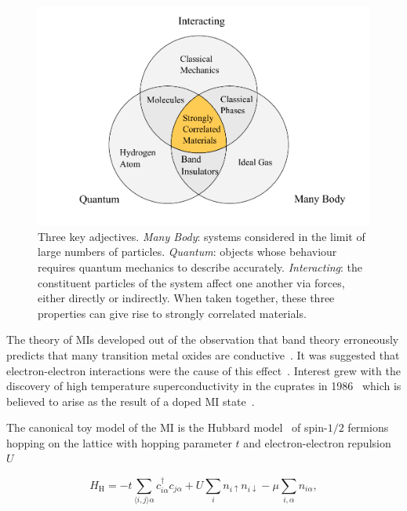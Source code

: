 \hypertarget{fig:venn_diagram}{%
\begin{figure}
\centering
\includegraphics[width=1\textwidth,height=\textheight]{figure_code/intro_chapter/venn_diagram}
\caption[{Interacting Quantum Many Body Systems Venn Diagram}]{Three key adjectives. \emph{Many Body}: systems considered in the limit of large numbers of particles. \emph{Quantum}: objects whose behaviour requires quantum mechanics to describe accurately. \emph{Interacting}: the constituent particles of the system affect one another via forces, either directly or indirectly. When taken together, these three properties can give rise to strongly correlated materials.}
\label{fig:venn_diagram}
\end{figure}
}

The theory of MIs developed out of the observation that band theory erroneously predicts that many transition metal oxides are conductive~\autocite{boerSemiconductorsPartiallyCompletely1937}. It was suggested that electron-electron interactions were the cause of this effect~\autocite{mottDiscussionPaperBoer1937}. Interest grew with the discovery of high temperature superconductivity in the cuprates in 1986~\autocite{bednorzPossibleHighTcSuperconductivity1986} which is believed to arise as the result of a doped MI state~\autocite{leeDopingMottInsulator2006}.

The canonical toy model of the MI is the Hubbard model~\autocite{gutzwillerEffectCorrelationFerromagnetism1963,kanamoriElectronCorrelationFerromagnetism1963,hubbardj.ElectronCorrelationsNarrow1963} of spin-\(1/2\) fermions hopping on the lattice with hopping parameter \(t\) and electron-electron repulsion \(U\)

\[ H_{\mathrm{H}} = -t \sum_{\langle i,j \rangle \alpha} c^\dagger_{i\alpha} c_{j\alpha} + U \sum_i n_{i\uparrow} n_{i\downarrow} - \mu \sum_{i,\alpha} n_{i\alpha},\]

